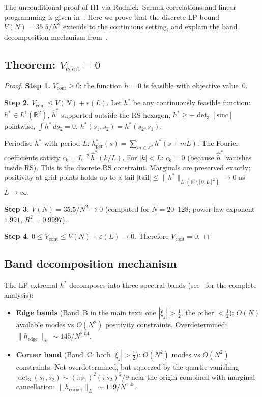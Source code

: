 \documentclass[10pt]{article}
\theoremstyle{remark}
\begin{document}
The unconditional proof of H1 via Rudnick--Sarnak correlations and linear
programming is given in~\cite{alarcon2026c}. Here we prove that
the discrete LP bound $V(N) = 35.5/N^2$ extends to the continuous setting,
and explain the band decomposition mechanism from~\cite{alarcon2026e}.

\subsection{Theorem: $V_{\mathrm{cont}} = 0$}

\begin{proof}
\textbf{Step 1.} $V_{\mathrm{cont}} \geq 0$: the function $h = 0$ is
feasible with objective value~$0$.

\textbf{Step 2.} $V_{\mathrm{cont}} \leq V(N) + \varepsilon(L)$.
Let $h^*$ be any continuously feasible function:
$h^* \in L^1(\mathbb{R}^2)$, $\hat{h}^*$ supported outside the RS hexagon,
$h^* \geq -\det_3[\mathrm{sinc}]$ pointwise,
$\int h^*\,ds_2 = 0$, $h^*(s_1,s_2) = h^*(s_2,s_1)$.

Periodise $h^*$ with period $L$:
$h^*_{\mathrm{per}}(s) = \sum_{m \in \mathbb{Z}^2} h^*(s + mL)$.
The Fourier coefficients satisfy $c_k = L^{-2}\,\hat{h}^*(k/L)$.
For $|k| < L$: $c_k = 0$ (because $\hat{h}^*$ vanishes inside RS).
This is the discrete RS constraint.
Marginals are preserved exactly; positivity at grid points holds up to a
tail $|\mathrm{tail}| \leq \|h^*\|_{L^1(\mathbb{R}^2 \setminus [0,L]^2)}
\to 0$ as $L \to \infty$.

\textbf{Step 3.} $V(N) = 35.5/N^2 \to 0$ (computed for $N = 20$--$128$;
power-law exponent $1.991$, $R^2 = 0.9997$).

\textbf{Step 4.} $0 \leq V_{\mathrm{cont}} \leq V(N) + \varepsilon(L)
\to 0$. Therefore $V_{\mathrm{cont}} = 0$. \qedhere
\end{proof}

\subsection{Band decomposition mechanism}

The LP extremal $h^*$ decomposes into three spectral bands
(see~\cite{alarcon2026e} for the complete analysis):

\begin{itemize}
\item \textbf{Edge bands} (Band~B in the main text:
one $|\xi_j| > \tfrac{1}{2}$, the other $< \tfrac{1}{2}$):
$O(N)$ available modes vs $O(N^2)$ positivity constraints.
Overdetermined: $\|h_{\mathrm{edge}}\|_\infty \sim 145/N^{2.04}$.

\item \textbf{Corner band} (Band~C:
both $|\xi_j| > \tfrac{1}{2}$):
$O(N^2)$ modes vs $O(N^2)$ constraints. Not overdetermined,
but squeezed by the quartic vanishing $\det_3(s_1,s_2) \sim
(\pi s_1)^2(\pi s_2)^2/9$ near the origin combined with marginal
cancellation: $\|h_{\mathrm{corner}}\|_{L^1} \sim 119/N^{1.45}$.
\end{itemize}
\end{document}
